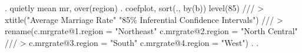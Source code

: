 . quietly mean mr, over(region)
{\smallskip}
. coefplot, sort(., by(b)) level(85) ///
>      xtitle("Average Marriage Rate" "85\% Inferential Confidence Intervals") ///
>          rename(c.mrgrate@1.region = "Northeast" c.mrgrate@2.region = "North Central" ///
>          c.mrgrate@3.region = "South" c.mrgrate@4.region = "West") 
{\smallskip}
. 
. 
